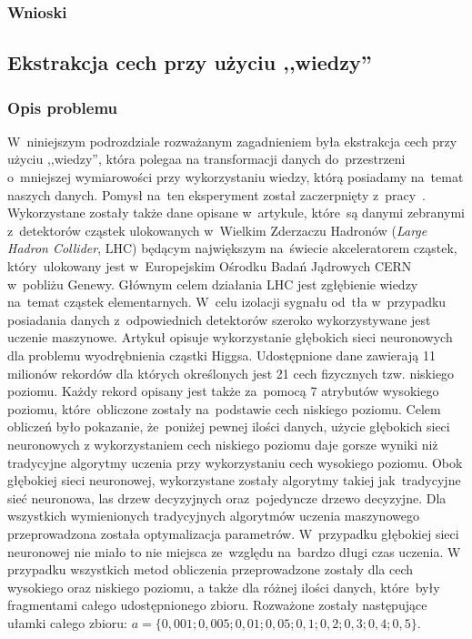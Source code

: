 \subsubsection{Wnioski}

\subsection{Ekstrakcja cech przy użyciu ,,wiedzy''}
\subsubsection{Opis problemu}
W~niniejszym podrozdziale rozważanym zagadnieniem była ekstrakcja cech przy użyciu ,,wiedzy'', która polegaa na transformacji danych do~przestrzeni o~mniejszej wymiarowości przy wykorzystaniu wiedzy, którą posiadamy na~temat naszych danych. Pomysł na~ten eksperyment został zaczerpnięty z~pracy~\cite{higgs1}. Wykorzystane zostały także dane opisane w~artykule, które~są danymi zebranymi z~detektorów cząstek ulokowanych w~Wielkim Zderzaczu Hadronów (\textit{Large Hadron Collider}, LHC) będącym największym na~świecie akceleratorem cząstek, który~ulokowany jest w~Europejskim Ośrodku Badań Jądrowych CERN w~pobliżu Genewy. Głównym celem działania LHC jest zgłębienie wiedzy na~temat cząstek elementarnych. W~celu izolacji sygnału od~tła w~przypadku posiadania danych z~odpowiednich detektorów szeroko wykorzystywane jest uczenie maszynowe. Artykuł opisuje wykorzystanie głębokich sieci neuronowych dla problemu wyodrębnienia cząstki Higgsa. Udostępnione dane zawierają 11 milionów rekordów dla których określonych jest 21 cech fizycznych tzw. niskiego poziomu. Każdy rekord opisany jest także za~pomocą 7 atrybutów wysokiego poziomu, które~obliczone zostały na~podstawie cech niskiego poziomu. Celem obliczeń było pokazanie, że~poniżej pewnej ilości danych, użycie głębokich sieci neuronowych z wykorzystaniem cech niskiego poziomu daje gorsze wyniki niż tradycyjne algorytmy uczenia przy wykorzystaniu cech wysokiego poziomu. Obok głębokiej sieci neuronowej, wykorzystane zostały algorytmy takiej jak~tradycyjne sieć neuronowa, las drzew decyzyjnych oraz~pojedyncze drzewo decyzyjne. Dla wszystkich wymienionych tradycyjnych algorytmów uczenia maszynowego przeprowadzona została optymalizacja parametrów. W~przypadku głębokiej sieci neuronowej nie miało to nie miejsca ze~względu na~bardzo długi czas uczenia. W przypadku wszystkich metod obliczenia przeprowadzone zostały dla cech wysokiego oraz niskiego poziomu, a także dla różnej ilości danych, które~były fragmentami całego udostępnionego zbioru. Rozważone zostały następujące ułamki całego zbioru: $a=\{0,001; 0,005; 0,01; 0,05; 0,1; 0,2; 0,3; 0,4; 0,5\}$. 

